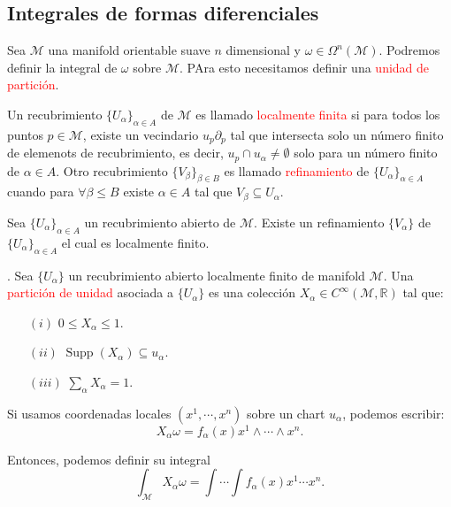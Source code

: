 \documentclass[../main]{subfiles}
\begin{document}
\begin{adjustwidth}{0pt}{-100pt}
\subsection{Integrales de formas diferenciales}
Sea $\mathcal{M}$ una manifold orientable suave $n$ dimensional y $\omega \in \Omega^n(\mathcal{M})$. Podremos definir la integral de $\omega$ sobre $\mathcal{M}$. PAra esto necesitamos definir una \textcolor{red}{unidad de partición}.

 Un recubrimiento $\{U_{\alpha}\}_{\alpha \in A}$ de $\mathcal{M}$ es llamado \textcolor{red}{localmente finita} si para todos los puntos $p \in \mathcal{M}$, existe un vecindario $u_p \partial_p$ tal que intersecta solo un número finito de elemenots de recubrimiento, es decir, $u_p \cap u_{\alpha} \neq \emptyset$ solo para un número finito de $\alpha \in A$. Otro recubrimiento $\{V_{\beta}\}_{\beta \in B}$ es llamado \textcolor{red}{refinamiento} de $\{ U_{\alpha}\}_{\alpha \in A}$ cuando para $\forall \beta \leq B$ existe $\alpha \in A$ tal que $V_{\beta} \subseteq U_{\alpha}$.

\teorema{} Sea $\{ U_{\alpha}\}_{\alpha \in A}$ un recubrimiento abierto de $\mathcal{M}$. Existe un refinamiento $\{V_{\alpha}\}$ de $\{U_{\alpha}\}_{\alpha \in A}$ el cual es localmente finito.

. Sea $\{U_{\alpha}\}$ un recubrimiento abierto localmente finito de manifold $\mathcal{M}$. Una \textcolor{red}{partición de unidad} asociada a $\{U_{\alpha}\}$ es una colección $X_{\alpha} \in C^{\infty}(\mathcal{M}, \mathbb{R})$ tal que: 
\begin{enumerate}
\addtolength{\itemindent}{6cm}
    \item[$(i)$] $0\leq X_{\alpha} \leq 1$.
    \item[$(ii)$] $\operatorname{Supp}(X_{\alpha})\subseteq u_{\alpha}$.
    \item[$(iii)$] $\sum_{\alpha} X_{\alpha}=1$. 
\end{enumerate}
Si usamos coordenadas locales $(x^1, \cdots, x^n)$ sobre un chart $u_{\alpha}$, podemos escribir:
\begin{equation}
    X_{\alpha}\omega=f_{\alpha}(x)x^1\wedge \cdots \wedge x^n.
\end{equation}

Entonces, podemos definir su integral
\begin{equation}
    \int_{\mathcal{M}} X_{\alpha} \omega=\int \cdots \int f_{\alpha}(x) x^1 \cdots x^n.
\end{equation}


\end{adjustwidth}
\end{document}
